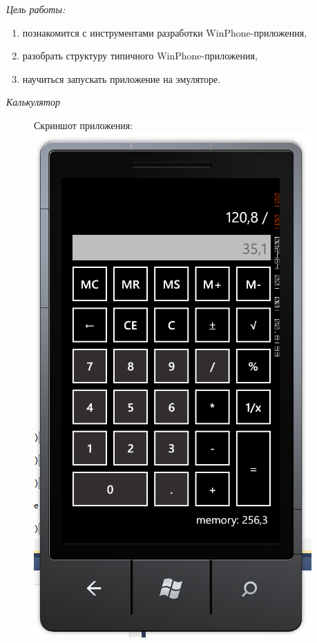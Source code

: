 \documentclass[pscyr,nonums]{hedlab}
\begin{document}
  \makeheader
  
  \emph{Цель работы:} 
  \begin{enumerate}
    \item познакомится с инструментами разработки WinPhone-приложения,
    \item разобрать структуру типичного WinPhone-приложения,
    \item научиться запускать приложение на эмуляторе.
  \end{enumerate}

  \vspace{2em}
  \emph{Калькулятор}
  
  
  
    
  
  \begin{figure}[h!]
    \center
    Скриншот приложения: \\
    \includegraphics[width=.5\textwidth]{screen}
  \end{figure}
\end{document}
